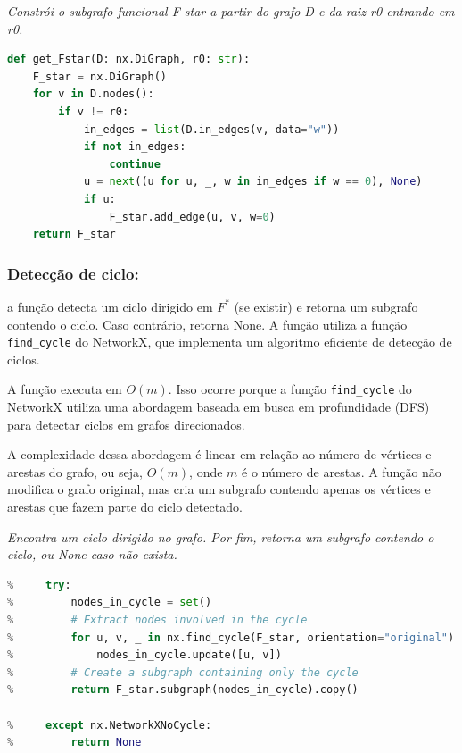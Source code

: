 \begin{tcolorbox}[
        enhanced, breakable,
        colframe=blue!60!black, colback=blue!2,
        colbacktitle=blue!15, coltitle=black,
        title={Construção de F star },
        boxed title style={sharp corners, boxrule=0.6pt},
        sharp corners, boxrule=0.6pt
    ]
    \emph{Constrói o subgrafo funcional F star a partir do grafo D e da raiz r0 entrando em r0.}
    \tcblower
    \begin{lstlisting}[mathescape=true, language=Python]
def get_Fstar(D: nx.DiGraph, r0: str):
    F_star = nx.DiGraph()
    for v in D.nodes():
        if v != r0:
            in_edges = list(D.in_edges(v, data="w"))
            if not in_edges:
                continue
            u = next((u for u, _, w in in_edges if w == 0), None)
            if u:
                F_star.add_edge(u, v, w=0)
    return F_star
\end{lstlisting}
\end{tcolorbox}

\subsubsection{Detecção de ciclo:}
a função detecta um ciclo dirigido em \(F^*\) (se existir) e retorna um subgrafo contendo o ciclo. Caso contrário, retorna None. A função utiliza a função \texttt{find\_cycle} do NetworkX, que implementa um algoritmo eficiente de detecção de ciclos.


A função executa em \(O(m)\). Isso ocorre porque a função \texttt{find\_cycle} do NetworkX utiliza uma abordagem baseada em busca em profundidade (DFS) para detectar ciclos em grafos direcionados.


A complexidade dessa abordagem é linear em relação ao número de vértices e arestas do grafo, ou seja, \(O(m)\), onde \(m\) é o número de arestas. A função não modifica o grafo original, mas cria um subgrafo contendo apenas os vértices e arestas que fazem parte do ciclo detectado.

\begin{tcolorbox}[
        enhanced, breakable,
        colframe=blue!60!black, colback=blue!2,
        colbacktitle=blue!15, coltitle=black,
        title={Detecção de ciclo dirigido em $F^*$},
        boxed title style={sharp corners, boxrule=0.6pt},
        sharp corners, boxrule=0.6pt
    ]
    \emph{Encontra um ciclo dirigido no grafo. Por fim, retorna um subgrafo contendo o ciclo, ou None caso não exista.}
    \tcblower
    \begin{lstlisting}[mathescape=true, language=Python]
% def find_cycle(F_star: nx.DiGraph):
%     try:
%         nodes_in_cycle = set()
%         # Extract nodes involved in the cycle
%         for u, v, _ in nx.find_cycle(F_star, orientation="original"):
%             nodes_in_cycle.update([u, v])
%         # Create a subgraph containing only the cycle
%         return F_star.subgraph(nodes_in_cycle).copy()

%     except nx.NetworkXNoCycle:
%         return None  
\end{lstlisting}
\end{tcolorbox}


